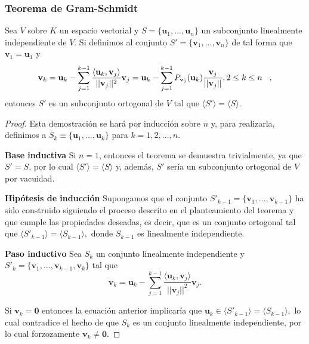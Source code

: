 \documentclass[12pt,dvipsnames]{article}
\newenvironment{teorema}[2][Teorema]{\begin{trivlist}
\item[\hskip \labelsep {\bfseries #1}\hskip \labelsep {\bfseries #2.}]}{\end{trivlist}}
\begin{document}
\subsubsection{Teorema de Gram-Schmidt} \label{Teo:Gram-Schmidt}

\begin{teorema} {4.3.2.1 (Gram-Schmidt)}
    Sea $V$ sobre $K$ un espacio vectorial y $S=\{\mathbf{u}_1, ..., \mathbf{u}_n\}$ un subconjunto linealmente independiente de $V$. Si definimos al conjunto $S'=\{\mathbf{v}_1, ..., \mathbf{v}_n\}$ de tal forma que $\mathbf{v}_1=\mathbf{u}_1$ y $$\mathbf{v}_k=\mathbf{u}_k-\sum_{j=1}^{k-1}\frac{\langle\mathbf{u}_k,\mathbf{v}_j\rangle}{||\mathbf{v}_j||^2} \mathbf{v}_j=\mathbf{u}_k-\sum_{j=1}^{k-1} P_{\mathbf{v}_j}(\mathbf{u}_k) \frac{\mathbf{v}_j}{||\mathbf{v}_j||},\hspace{3mm 2\leq k\leq n},$$ entonces $S'$ es un subconjunto ortogonal de $V$ tal que $\langle S' \rangle = \langle S \rangle.$

\begin{proof}
    Esta demostración se hará por inducción sobre $n$ y, para realizarla, definimos a $S_k\equiv\{\mathbf{u}_1, ..., \mathbf{u}_k\}$ para $k=1,2, ..., n.$

    \vspace{3mm}
\textbf{Base inductiva}
Si $n=1$, entonces el teorema se demuestra trivialmente, ya que $S'=S$, por lo cual $\langle S' \rangle =\langle S \rangle$ y, además,  $S'$ sería un subconjunto ortogonal de $V$ por vacuidad.

    \vspace{3mm}
\textbf{Hipótesis de inducción}
Supongamos que el conjunto $S'_{k-1}=\{\mathbf{v}_1, ..., \mathbf{v}_{k-1}\}$ ha sido construido siguiendo el proceso descrito en el planteamiento del teorema y que cumple las propiedades deseadas, es decir, que es un conjunto ortogonal tal que $\langle S'_{k-1} \rangle = \langle S_{k-1} \rangle,$ donde $S_{k-1}$ es linealmente independiente.

    \vspace{3mm}
\textbf{Paso inductivo}
    Sea $S_k$ un conjunto linealmente independiente y $S'_k=\{\mathbf{v}_1, ..., \mathbf{v}_{k-1}, \mathbf{v}_k\}$ tal que $$\mathbf{v}_k=\mathbf{u}_k-\sum_{j=1}^{k-1}\frac{\langle\mathbf{u}_k,\mathbf{v}_j\rangle}{||\mathbf{v}_j||^2}\mathbf{v}_j.$$

    Si $\mathbf{v}_k=\mathbf{0}$ entonces la ecuación anterior implicaría que $\mathbf{u}_k\in\langle S'_{k-1} \rangle = \langle S_{k-1} \rangle,$ lo cual contradice el hecho de que $S_k$ es un conjunto linealmente independiente, por lo cual forzozamente $\mathbf{v}_k\neq\mathbf{0}.$ 


\end{proof}
\end{teorema}
\end{document}
